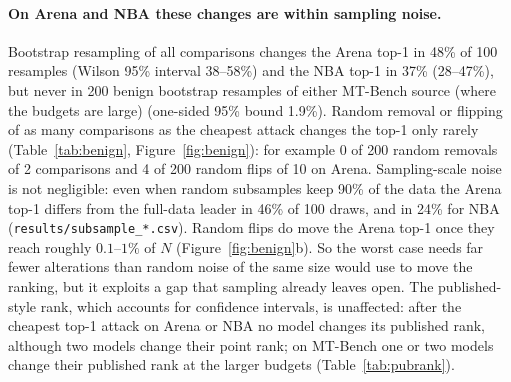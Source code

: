\documentclass{article}
\begin{document}
\paragraph{On Arena and NBA these changes are within sampling noise.}
Bootstrap resampling of all comparisons changes the Arena top-1 in 48\% of 100 resamples (Wilson 95\% interval 38--58\%) and the NBA top-1 in 37\% (28--47\%), but never in 200 benign bootstrap resamples of either MT-Bench source (where the budgets are large) (one-sided 95\% bound 1.9\%). Random removal or flipping of as many comparisons as the cheapest attack changes the top-1 only rarely (Table~\ref{tab:benign}, Figure~\ref{fig:benign}): for example 0 of 200 random removals of 2 comparisons and 4 of 200 random flips of 10 on Arena. Sampling-scale noise is not negligible: even when random subsamples keep 90\% of the data the Arena top-1 differs from the full-data leader in 46\% of 100 draws, and in 24\% for NBA (\texttt{results/subsample\_*.csv}). Random flips do move the Arena top-1 once they reach roughly $0.1$--$1\%$ of $N$ (Figure~\ref{fig:benign}b). So the worst case needs far fewer alterations than random noise of the same size would use to move the ranking, but it exploits a gap that sampling already leaves open. The published-style rank, which accounts for confidence intervals, is unaffected: after the cheapest top-1 attack on Arena or NBA no model changes its published rank, although two models change their point rank; on MT-Bench one or two models change their published rank at the larger budgets (Table~\ref{tab:pubrank}).
\end{document}
